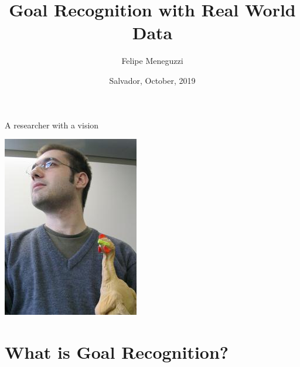\documentclass[usenames,dvipsnames]{beamer}
\title[\fontsize{0.08cm}{1em}\selectfont Goal Recognition with Real World Data]{Goal Recognition with Real World Data}
\author[Meneguzzi]{Felipe Meneguzzi\dag
}
\institute[]{\dag Pontifical Catholic University of Rio Grande do Sul, Brazil
\\
\url{felipe.meneguzzi@pucrs.br}
}
\date{Salvador, October, 2019}
\begin{document}

    \begin{frame}
        \titlepage
    \end{frame}
	\logo{}
    
	\begin{frame}[c]{A researcher with a vision}
		\begin{center}
			\includegraphics[height=.8\textheight]{fig/felipe1.jpg}
		\end{center}
	\end{frame}
\section{What is Goal Recognition?}

\end{document}
